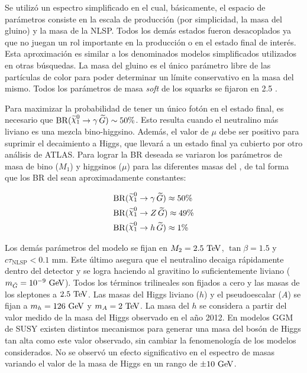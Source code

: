 Se utilizó un espectro simplificado en el cual, básicamente, el espacio de
parámetros consiste en la escala de producción (por simplicidad, la masa del
gluino) y la masa de la NLSP. Todos los demás estados fueron desacoplados ya que
no juegan un rol importante en la producción o en el estado final de interés.
Esta aproximación es similar a los denominados modelos simplificados
utilizados en otras búsquedas.
La masa del gluino es el único parámetro libre de las partículas de color para
poder determinar un límite conservativo en la masa del mismo. Todos los
parámetros de masa \emph{soft} de los squarks se fijaron en 2.5 \tev.

Para maximizar la probabilidad de tener un único fotón en el estado final, es
necesario que $\mathrm{BR}(\ninoone \to \gam\,\gravino) \sim 50\%$. Esto resulta
cuando el neutralino más liviano es una mezcla bino-higgsino. Además, el valor
de $\mu$ debe ser positivo para suprimir el decaimiento a Higgs, que llevará a
un estado final ya cubierto por otro análisis de ATLAS. Para lograr la BR
deseada se variaron los parámetros de masa de bino ($M_1$) y higgsinos ($\mu$)
para las diferentes masas del {\ninoone}, de tal forma que los BR del {\ninoone}
sean aproximadamente constantes:

\begin{align}
  &\mathrm{BR}(\ninoone \to \gam\, \gravino) \approx 50\% \label{eq:n1_gam}\\
  &\mathrm{BR}(\ninoone \to Z\, \gravino) \approx 49\%    \label{eq:n1_z} \\
  &\mathrm{BR}(\ninoone \to h\, \gravino) \approx 1\%     \label{eq:n1_h}
\end{align}

Los demás parámetros del modelo se fijan en $M_2=2.5\tev$, $\tan\beta=1.5$ y
$c\tau_{\mathrm{NLSP}} < 0.1$ mm. Este último asegura que el neutralino decaiga
rápidamente dentro del detector y se logra haciendo al gravitino lo
suficientemente liviano ($m_{\tilde{G}}=10^{-9} \gev$). Todos los términos
trilineales son fijados a cero y las masas de los sleptones a $2.5 \tev$.
Las masas del Higgs liviano ($h$) y el pseudoescalar ($A$) se fijan a
$m_{h} = 126 \gev$ y $m_{A} = 2 \tev$.
La masa del $h$ se considera a partir del valor
medido de la masa del Higgs observado en el a\~no 2012.
En modelos GGM de SUSY existen distintos
mecanismos\cite{Craig:2011yk,Auzzi:2011eu,Csaki:2012fh,Larsen:2012rq,Craig:2012hc}
para generar una masa del bosón de Higgs tan alta como este valor observado, sin
cambiar la fenomenología de los modelos considerados. No se observó un efecto
significativo en el espectro de masas variando el valor de la masa de Higgs en un
rango de $\pm 10 \gev$.

